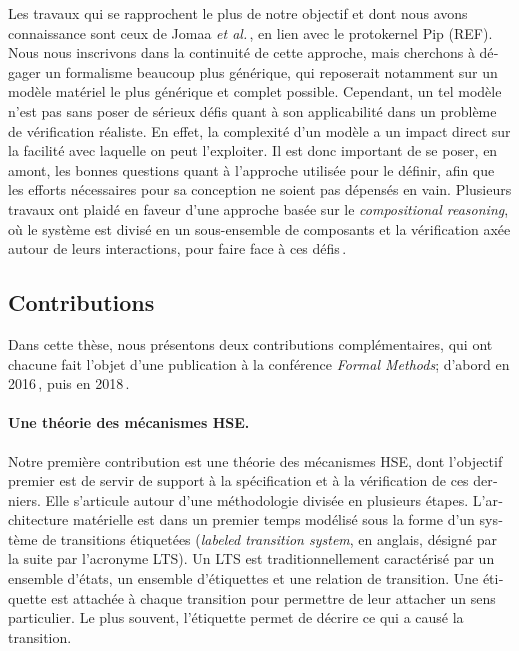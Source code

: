 \begin{otherlanguage}{french}
  Les travaux qui se rapprochent le plus de notre objectif et dont nous avons
  connaissance sont ceux de Jomaa \emph{et al.}\,\cite{jomaa2016mmu}, en lien
  avec le protokernel Pip (REF).
  Nous nous inscrivons dans la continuité de cette approche, mais cherchons à
  dégager un formalisme beaucoup plus générique, qui reposerait notamment sur un
  modèle matériel le plus générique et complet possible.
  Cependant, un tel modèle n’est pas sans poser de sérieux défis quant à son
  applicabilité dans un problème de vérification réaliste.
  En effet, la complexité d’un modèle a un impact direct sur la facilité avec
  laquelle on peut l’exploiter.
  Il est donc important de se poser, en amont, les bonnes
  questions quant à l’approche utilisée pour le définir, afin que les efforts
  nécessaires pour sa conception ne soient pas dépensés en vain.
  Plusieurs travaux ont plaidé en faveur d’une approche basée sur le
  \emph{compositional reasoning}, où le système est divisé en un sous-ensemble
  de composants et la vérification axée autour de leurs interactions, pour faire
  face à ces défis\,\cite{garg2010compositional,heyman2012securemodel}.

  \subsection*{Contributions}

  Dans cette thèse, nous présentons deux contributions complémentaires, qui ont
  chacune fait l’objet d’une publication à la conférence \emph{Formal Methods};
  d’abord en 2016\,\cite{letan2016speccert}, puis en
  2018\,\cite{letan2018freespec}.

  \paragraph{Une théorie des mécanismes HSE.}
  Notre première contribution est une théorie des mécanismes HSE, dont
  l’objectif premier est de servir de support à la spécification et à la
  vérification de ces derniers.
  Elle s’articule autour d’une méthodologie divisée en plusieurs étapes.
  L’architecture matérielle est dans un premier temps modélisé sous la forme
  d’un système de transitions étiquetées (\emph{labeled transition system}, en
  anglais, désigné par la suite par l’acronyme LTS).
  Un LTS est traditionnellement caractérisé par un ensemble d’états, un ensemble
  d’étiquettes et une relation de transition.
  Une étiquette est attachée à chaque transition pour permettre de leur attacher
  un sens particulier.
  Le plus souvent, l’étiquette permet de décrire ce qui a causé la transition.


\end{otherlanguage}
